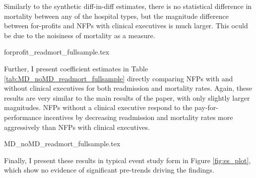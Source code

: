\documentclass[12pt]{article}
\begin{document}
Similarly to the synthetic diff-in-diff estimates, there is no statistical difference in mortality between any of the hospital types, but the magnitude difference between for-profits and NFPs with clinical executives is much larger. This oculd be due to the noisiness of mortality as a measure. 

{forprofit_readmort_fullsample.tex}

Further, I present coefficient estimates in Table \ref{tab:MD_noMD_readmort_fullsample} directly comparing NFPs with and without clinical executives for both readmission and mortality rates. Again, these results are very similar to the main results of the paper, with only slightly larger magnitudes. NFPs without a clinical executive respond to the pay-for-performance incentives by decreasing readmission and mortality rates more aggressively than NFPs with clinical executives. 

{MD_noMD_readmort_fullsample.tex}

Finally, I present these results in typical event study form in Figure \ref{fig:es_plot}, which show no evidence of significant pre-trends driving the findings. 
\end{document}
